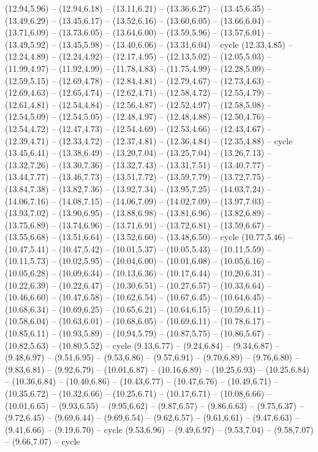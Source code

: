 \expandafter\def\csname geo:gebiet:MA\endcsname{
  (12.94,5.96) -- (12.94,6.18) -- (13.11,6.21) -- (13.36,6.27) -- (13.45,6.35) -- (13.49,6.29) -- (13.45,6.17) -- (13.52,6.16) -- (13.60,6.05) -- (13.66,6.04) -- (13.71,6.09) -- (13.73,6.05) -- (13.64,6.00) -- (13.59,5.96) -- (13.57,6.01) -- (13.49,5.92) -- (13.45,5.98) -- (13.40,6.06) -- (13.31,6.04) -- cycle}
\expandafter\def\csname geo:gebiet:MD\endcsname{
  (12.33,4.85) -- (12.24,4.89) -- (12.24,4.92) -- (12.17,4.95) -- (12.13,5.02) -- (12.05,5.03) -- (11.99,4.97) -- (11.92,4.99) -- (11.78,4.83) -- (11.75,4.99) -- (12.28,5.09) -- (12.59,5.15) -- (12.69,4.78) -- (12.84,4.81) -- (12.79,4.67) -- (12.73,4.63) -- (12.69,4.63) -- (12.65,4.74) -- (12.62,4.71) -- (12.58,4.72) -- (12.55,4.79) -- (12.61,4.81) -- (12.54,4.84) -- (12.56,4.87) -- (12.52,4.97) -- (12.58,5.08) -- (12.54,5.09) -- (12.54,5.05) -- (12.48,4.97) -- (12.48,4.88) -- (12.50,4.76) -- (12.54,4.72) -- (12.47,4.73) -- (12.54,4.69) -- (12.53,4.66) -- (12.43,4.67) -- (12.39,4.71) -- (12.33,4.72) -- (12.37,4.81) -- (12.36,4.84) -- (12.35,4.88) -- cycle}
\expandafter\def\csname geo:gebiet:ME\endcsname{
  (13.45,6.41) -- (13.38,6.49) -- (13.20,7.04) -- (13.25,7.04) -- (13.26,7.13) -- (13.32,7.26) -- (13.30,7.36) -- (13.32,7.43) -- (13.31,7.51) -- (13.40,7.77) -- (13.44,7.77) -- (13.46,7.73) -- (13.51,7.72) -- (13.59,7.79) -- (13.72,7.75) -- (13.84,7.38) -- (13.82,7.36) -- (13.92,7.34) -- (13.95,7.25) -- (14.03,7.24) -- (14.06,7.16) -- (14.08,7.15) -- (14.06,7.09) -- (14.02,7.09) -- (13.97,7.03) -- (13.93,7.02) -- (13.90,6.95) -- (13.88,6.98) -- (13.81,6.96) -- (13.82,6.89) -- (13.75,6.89) -- (13.74,6.96) -- (13.71,6.91) -- (13.72,6.81) -- (13.59,6.67) -- (13.55,6.68) -- (13.51,6.64) -- (13.52,6.60) -- (13.48,6.50) -- cycle}
\expandafter\def\csname geo:gebiet:MI\endcsname{
  (10.77,5.46) -- (10.47,5.41) -- (10.47,5.42) -- (10.01,5.37) -- (10.05,5.43) -- (10.11,5.59) -- (10.11,5.73) -- (10.02,5.95) -- (10.04,6.00) -- (10.01,6.08) -- (10.05,6.16) -- (10.05,6.28) -- (10.09,6.34) -- (10.13,6.36) -- (10.17,6.44) -- (10.20,6.31) -- (10.22,6.39) -- (10.22,6.47) -- (10.30,6.51) -- (10.27,6.57) -- (10.33,6.64) -- (10.46,6.60) -- (10.47,6.58) -- (10.62,6.54) -- (10.67,6.45) -- (10.64,6.45) -- (10.68,6.34) -- (10.69,6.25) -- (10.65,6.21) -- (10.64,6.15) -- (10.59,6.11) -- (10.58,6.04) -- (10.63,6.01) -- (10.68,6.05) -- (10.69,6.11) -- (10.78,6.17) -- (10.85,6.11) -- (10.93,5.89) -- (10.94,5.79) -- (10.87,5.75) -- (10.86,5.67) -- (10.82,5.63) -- (10.80,5.52) -- cycle
  (9.13,6.77) -- (9.24,6.84) -- (9.34,6.87) -- (9.48,6.97) -- (9.51,6.95) -- (9.53,6.86) -- (9.57,6.91) -- (9.70,6.89) -- (9.76,6.80) -- (9.83,6.81) -- (9.92,6.79) -- (10.01,6.87) -- (10.16,6.89) -- (10.25,6.93) -- (10.25,6.84) -- (10.36,6.84) -- (10.40,6.86) -- (10.43,6.77) -- (10.47,6.76) -- (10.49,6.71) -- (10.35,6.72) -- (10.32,6.66) -- (10.25,6.71) -- (10.17,6.71) -- (10.08,6.66) -- (10.01,6.65) -- (9.93,6.55) -- (9.95,6.62) -- (9.87,6.57) -- (9.86,6.63) -- (9.75,6.37) -- (9.72,6.45) -- (9.69,6.44) -- (9.69,6.54) -- (9.62,6.57) -- (9.61,6.61) -- (9.47,6.63) -- (9.41,6.66) -- (9.19,6.70) -- cycle
  (9.53,6.96) -- (9.49,6.97) -- (9.53,7.04) -- (9.58,7.07) -- (9.66,7.07) -- cycle}
